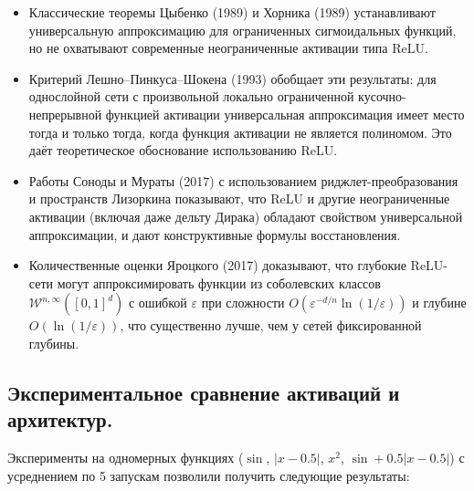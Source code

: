 \documentclass[12pt]{article}
\begin{document}
	\begin{itemize}
		\item Классические теоремы Цыбенко (1989) и Хорника (1989) устанавливают универсальную аппроксимацию для ограниченных сигмоидальных функций, но не охватывают современные неограниченные активации типа ReLU.
		\item Критерий Лешно–Пинкуса–Шокена (1993) обобщает эти результаты: для однослойной сети с произвольной локально ограниченной кусочно-непрерывной функцией активации универсальная аппроксимация имеет место тогда и только тогда, когда функция активации не является полиномом. Это даёт теоретическое обоснование использованию ReLU.
		\item Работы Соноды и Мураты (2017) с использованием риджлет-преобразования и пространств Лизоркина показывают, что ReLU и другие неограниченные активации (включая даже дельту Дирака) обладают свойством универсальной аппроксимации, и дают конструктивные формулы восстановления.
		\item Количественные оценки Яроцкого (2017) доказывают, что глубокие ReLU-сети могут аппроксимировать функции из соболевских классов $\mathcal{W}^{n,\infty}([0,1]^d)$ с ошибкой $\varepsilon$ при сложности $O(\varepsilon^{-d/n}\ln(1/\varepsilon))$ и глубине $O(\ln(1/\varepsilon))$, что существенно лучше, чем у сетей фиксированной глубины.
	\end{itemize}
	
	\subsection*{Экспериментальное сравнение активаций и архитектур.}
	
	Эксперименты на одномерных функциях ($\sin$, $|x-0.5|$, $x^2$, $\sin + 0.5|x-0.5|$) с усреднением по 5 запускам позволили получить следующие результаты:
	
\end{document}
